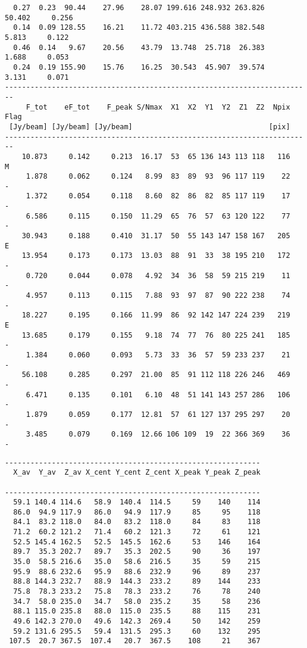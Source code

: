{\begin{verbatim}
  0.27  0.23  90.44    27.96    28.07 199.616 248.932 263.826    50.402     0.256
  0.14  0.09 128.55    16.21    11.72 403.215 436.588 382.548     5.813     0.122
  0.46  0.14   9.67    20.56    43.79  13.748  25.718  26.383     1.688     0.053
  0.24  0.19 155.90    15.76    16.25  30.543  45.907  39.574     3.131     0.071
------------------------------------------------------------------------
     F_tot    eF_tot    F_peak S/Nmax  X1  X2  Y1  Y2  Z1  Z2  Npix Flag
 [Jy/beam] [Jy/beam] [Jy/beam]                                [pix]     
------------------------------------------------------------------------
    10.873     0.142     0.213  16.17  53  65 136 143 113 118   116    M
     1.878     0.062     0.124   8.99  83  89  93  96 117 119    22    -
     1.372     0.054     0.118   8.60  82  86  82  85 117 119    17    -
     6.586     0.115     0.150  11.29  65  76  57  63 120 122    77    -
    30.943     0.188     0.410  31.17  50  55 143 147 158 167   205    E
    13.954     0.173     0.173  13.03  88  91  33  38 195 210   172    -
     0.720     0.044     0.078   4.92  34  36  58  59 215 219    11    -
     4.957     0.113     0.115   7.88  93  97  87  90 222 238    74    -
    18.227     0.195     0.166  11.99  86  92 142 147 224 239   219    E
    13.685     0.179     0.155   9.18  74  77  76  80 225 241   185    -
     1.384     0.060     0.093   5.73  33  36  57  59 233 237    21    -
    56.108     0.285     0.297  21.00  85  91 112 118 226 246   469    -
     6.471     0.135     0.101   6.10  48  51 141 143 257 286   106    -
     1.879     0.059     0.177  12.81  57  61 127 137 295 297    20    -
     3.485     0.079     0.169  12.66 106 109  19  22 366 369    36    -
\end{verbatim}
\newpage
\begin{verbatim}
------------------------------------------------------------
  X_av  Y_av  Z_av X_cent Y_cent Z_cent X_peak Y_peak Z_peak
                                                            
------------------------------------------------------------
  59.1 140.4 114.6   58.9  140.4  114.5     59    140    114
  86.0  94.9 117.9   86.0   94.9  117.9     85     95    118
  84.1  83.2 118.0   84.0   83.2  118.0     84     83    118
  71.2  60.2 121.2   71.4   60.2  121.3     72     61    121
  52.5 145.4 162.5   52.5  145.5  162.6     53    146    164
  89.7  35.3 202.7   89.7   35.3  202.5     90     36    197
  35.0  58.5 216.6   35.0   58.6  216.5     35     59    215
  95.9  88.6 232.6   95.9   88.6  232.9     96     89    237
  88.8 144.3 232.7   88.9  144.3  233.2     89    144    233
  75.8  78.3 233.2   75.8   78.3  233.2     76     78    240
  34.7  58.0 235.0   34.7   58.0  235.2     35     58    236
  88.1 115.0 235.8   88.0  115.0  235.5     88    115    231
  49.6 142.3 270.0   49.6  142.3  269.4     50    142    259
  59.2 131.6 295.5   59.4  131.5  295.3     60    132    295
 107.5  20.7 367.5  107.4   20.7  367.5    108     21    367
\end{verbatim}
}

